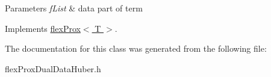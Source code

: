 \begin{DoxyParams}{Parameters}
{\em f\+List} & data part of term \\
\hline
\end{DoxyParams}


Implements \hyperlink{classflex_prox_aec433ffbf1a7586f26a2116c6b94bdd6}{flex\+Prox$<$ T $>$}.



The documentation for this class was generated from the following file\+:\begin{DoxyCompactItemize}
\item 
flex\+Prox\+Dual\+Data\+Huber.\+h\end{DoxyCompactItemize}
